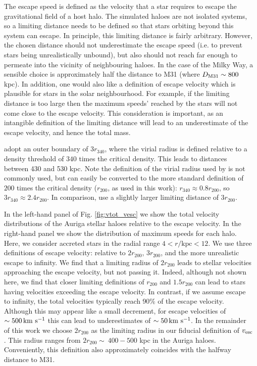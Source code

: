 \documentclass[fleqn,usenatbib]{mnras}
\newcommand{\kms}        {\,{\rm km}\,\,{\rm s}^{-1}}
\begin{document}
The escape speed is defined as the velocity that a star requires to escape the gravitational field of a host halo. The simulated haloes are not isolated systems, so a limiting distance needs to be defined so that stars orbiting beyond this system can escape. In principle, this limiting distance is fairly arbitrary. However, the chosen distance should not underestimate the escape speed (i.e. to prevent stars being unrealistically unbound), but also should not reach far enough to permeate into the vicinity of neighbouring haloes. In the case of the Milky Way, a sensible choice is approximately half the distance to M31 (where $D_{\rm M31} \sim 800$ kpc). In addition, one would also like a definition of escape velocity which is plausible for stars in the solar neighbourhood. For example, if the limiting distance is too large then the maximum speeds' reached by the stars will not come close to the escape velocity. This consideration is important, as an intangible definition of the limiting distance will lead to an underestimate of the escape velocity, and hence the total mass.

\cite{piffl14} adopt an outer boundary of 3$r_{340}$, where the virial radius is defined relative to a density threshold of $340$ times the critical density. This leads to distances between 430 and 530 kpc. Note the definition of the virial radius used by \cite{piffl14} is not commonly used, but can easily be converted to the more standard definition of $200$ times the critical density ($r_{200}$, as used in this work): $r_{340} \approx 0.8r_{200}$, so $3r_{340} \approx 2.4r_{200}$. In comparison, \cite{smith07} use a slightly larger limiting distance of $3r_{200}$. 

In the left-hand panel of Fig. \ref{fig:vtot_vesc} we show the total velocity distributions of the Auriga stellar haloes relative to the escape velocity. In the right-hand panel we show the distribution of maximum speeds for each halo. Here, we consider accreted stars in the radial range $4 < r/\mathrm{kpc} < 12$. We use three definitions of escape velocity: relative to $2r_{200}$, $3r_{200}$, and the more unrealistic escape to infinity. We find that a limiting radius of $2r_{200}$ leads to stellar velocities approaching the escape velocity, but not passing it. Indeed, although not shown here, we find that closer limiting definitions of $r_{200}$ and $1.5r_{200}$ can lead to stars having velocities exceeding the escape velocity. In contrast, if we assume escape to infinity, the total velocities typically reach 90\% of the escape velocity. Although this may appear like a small decrement, for escape velocities of $\sim 500 \kms$ this can lead to underestimates of $\sim 50 \kms$. In the remainder of this work we choose $2r_{200}$ as the limiting radius in our fiducial definition of $v_{\rm esc}$. This radius ranges from $2r_{200} \sim~400-500$ kpc in the Auriga haloes. Conveniently, this definition also approximately coincides with the halfway distance to M31.
\end{document}
